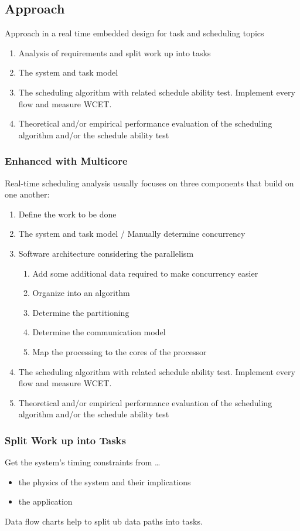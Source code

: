 \subsection{Approach}
Approach in a real time embedded design for task and scheduling topics
\begin{enumerate}
	\item Analysis of requirements and split work up into tasks
	\item The system and task model
	\item The scheduling algorithm with related schedule ability test.
	      Implement every flow and measure WCET.
	\item Theoretical and/or empirical performance evaluation of the scheduling algorithm and/or the schedule ability test
\end{enumerate}

\subsubsection{Enhanced with Multicore}
Real-time scheduling analysis usually focuses on three components that build on one another:
\begin{enumerate}
	\item Define the work to be done
	\item The system and task model / Manually determine concurrency
	\item Software architecture considering the parallelism
	      \begin{enumerate}
		      \item Add some additional data required to make concurrency easier
		      \item Organize into an algorithm
		      \item Determine the partitioning
		      \item Determine the communication model
		      \item Map the processing to the cores of the processor
	      \end{enumerate}
	\item The scheduling algorithm with related schedule ability test. Implement every flow and measure WCET.
	\item Theoretical and/or empirical performance evaluation of the scheduling algorithm and/or the schedule ability test
\end{enumerate}

\subsubsection{Split Work up into Tasks}
Get the system's timing constraints from \ldots
\begin{itemize}[label=\ldots]
	\item the physics of the system and their implications
	\item the application
\end{itemize}
Data flow charts help to split ub data paths into tasks.

